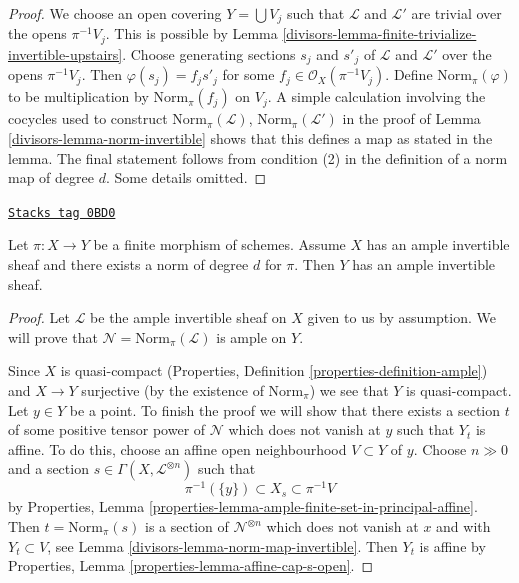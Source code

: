 \begin{proof}

We choose an open covering $Y = \bigcup V_j$ such that
$\mathcal{L}$ and $\mathcal{L}'$ are trivial over the opens $\pi^{-1}V_j$.
This is possible by
Lemma \ref{divisors-lemma-finite-trivialize-invertible-upstairs}.
Choose generating sections
$s_j$ and $s'_j$ of $\mathcal{L}$ and $\mathcal{L}'$
over the opens $\pi^{-1}V_j$. Then $\varphi(s_j) = f_js'_j$
for some $f_j \in \mathcal{O}_X(\pi^{-1}V_j)$.
Define $\text{Norm}_\pi(\varphi)$ to be multiplication
by $\text{Norm}_\pi(f_j)$ on $V_j$. A simple
calculation involving the cocycles used to construct
$\text{Norm}_\pi(\mathcal{L})$, $\text{Norm}_\pi(\mathcal{L}')$
in the proof of Lemma \ref{divisors-lemma-norm-invertible}
shows that this defines
a map as stated in the lemma. The final statement follows
from condition (2) in the definition of a norm map of degree $d$.
Some details omitted.
\end{proof}

\begin{lemma}
\label{divisors-lemma-norm-ample}
\href{https://stacks.math.columbia.edu/tag/0BD0}{\texttt{Stacks tag 0BD0}}

Let $\pi : X \to Y$ be a finite morphism of schemes. Assume $X$ has
an ample invertible sheaf and there exists a norm of degree $d$
for $\pi$. Then $Y$ has an ample invertible sheaf.
\end{lemma}

\begin{proof}

Let $\mathcal{L}$ be the ample invertible sheaf on $X$ given to us
by assumption. We will prove that $\mathcal{N} = \text{Norm}_\pi(\mathcal{L})$
is ample on $Y$.

\medskip\noindent
Since $X$ is quasi-compact (Properties, Definition
\ref{properties-definition-ample}) and $X \to Y$ surjective
(by the existence of $\text{Norm}_\pi$)
we see that $Y$ is quasi-compact.
Let $y \in Y$ be a point. To finish the proof
we will show that there exists a section $t$ of some positive tensor
power of $\mathcal{N}$ which does not vanish at $y$ such that $Y_t$
is affine. To do this, choose an affine open neighbourhood $V \subset Y$
of $y$. Choose $n \gg 0$ and a section
$s \in \Gamma(X, \mathcal{L}^{\otimes n})$
such that
$$
\pi^{-1}(\{y\}) \subset X_s \subset \pi^{-1}V
$$
by
Properties, Lemma \ref{properties-lemma-ample-finite-set-in-principal-affine}.
Then $t = \text{Norm}_\pi(s)$ is a section of $\mathcal{N}^{\otimes n}$
which does not vanish at $x$ and with $Y_t \subset V$, see
Lemma \ref{divisors-lemma-norm-map-invertible}. Then $Y_t$
is affine by Properties, Lemma \ref{properties-lemma-affine-cap-s-open}.
\end{proof}

